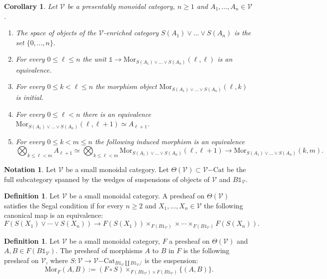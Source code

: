 \documentclass[10pt,oneside]{article}
\numberwithin{equation}{section} %
\numberwithin{figure}{section} %
\theoremstyle{plain}
\newtheorem{corollary}[theorem]{Corollary}
\theoremstyle{definition}
\newtheorem{definition}[theorem]{Definition}
\newtheorem{notation}[theorem]{Notation}
\newcommand{\mV}{{\mathcal V}}
\newcommand{\A}{A}
\newcommand{\m}{{m}}
\newcommand{\bk}{{k}}
\newcommand{\n}{{n}}
\newcommand{\Cat}{\mathrm{Cat}}
\newcommand{\tu}{{\mathbb 1}}
\newcommand{\Mor}{{\mathrm{Mor}}}
\begin{document}
\begin{corollary}

Let $\mV$ be a presentably monoidal category, $n \geq 1$ and $\A_1, ..., \A_\n \in \mV$.
\begin{enumerate}[\normalfont(1)]\setlength{\itemsep}{-2pt}
\item The space of objects of the $\mV$-enriched category $S(A_1) \vee ...\vee S(A_n)$ is the set $\{0,...,\n\}.$
\item For every $0 \leq \ell \leq \n$ the unit $\tu \to \Mor_{S(A_1) \vee ...\vee S(A_n)}(\ell,\ell)$ is an equivalence.
\item For every $0 \leq \bk < \ell \leq \n$ the morphism object $\Mor_{S(A_1) \vee ...\vee S(A_n)}(\ell,\bk)$ is initial.
\item For every $0 \leq \ell < \n$ there is an equivalence $ \Mor_{S(A_1) \vee ...\vee S(A_n)}(\ell,\ell+1) \simeq \A_{\ell+1}$. 
\item For every $0 \leq \bk < \m \leq \n$ the following induced morphism is an equivalence $$\bigotimes_{\bk \leq \ell < \m}  \A_{\ell+1} \simeq \bigotimes_{\bk \leq \ell < \m} \Mor_{S(A_1) \vee ...\vee S(A_n)}(\ell,\ell+1) \to \Mor_{S(A_1) \vee ...\vee S(A_n)}(\bk,\m).$$
\end{enumerate}
\end{corollary}



\begin{notation}\label{Thetasgen}Let $\mV$ be a small monoidal category. Let $\Theta(\mV) \subset \mV\mathrm{-}\Cat$ be the full subcategory spanned by the wedges of suspensions of objects of $\mV$ and $B\tu_\mV$.

\end{notation}

\begin{definition}

Let $\mV$ be a small monoidal category.
A presheaf on $\Theta(\mV) $ satisfies the Segal condition 
if for every $n \geq 2$ and $X_1,...,X_n \in \mV$
the following canonical map is an equivalence:
$$ F(S(X_1) \vee\cdots\vee S(X_n)) \to F(S(X_1)) \times_{F(B\tu_\mV)}\times\cdots \times_{F(B\tu_\mV)} F(S(X_n)).$$
    
\end{definition}



\begin{definition}Let $\mV$ be a small monoidal category, $F$ a presheaf on $\Theta(\mV)$ and $A,B \in F(B\tu_\mV). $ 
The presheaf of morphisms $A$ to $B$ in $F$ is the following presheaf on $\mV$, where $S: \mV \to \mV\mathrm{-}\Cat_{B\tu_\mV \coprod B\tu_\mV/}$ is the suspension:
$$\Mor_F(A,B):= (F \circ S) \times_{F(B\tu_\mV) \times F(B\tu_\mV)} \{(A,B)\}.$$
    
\end{definition}
\end{document}
